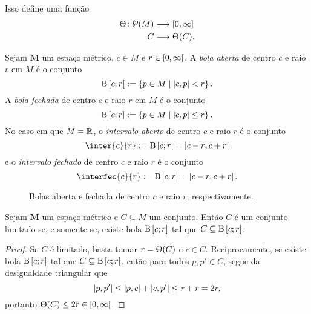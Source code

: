 Isso define uma função
	\begin{align*}
	\func{\diam}{\p(M)}{\intff{0}{\infty}}{C}{\diam(C)}.
	\end{align*}

\begin{definition}
Sejam $\bm M$ um espaço métrico, $c \in M$ e $r \in \left[{0},{\infty}\right[$. A \emph{bola aberta} de centro $c$ e raio $r$ em $M$ é o conjunto
	\begin{equation*}
	\mathrm{B}\left[{c};{r}\right[ := \left\{{p \in M}\;\middle\vert\;{\left\vert{c},{p}\right\vert < r}\right\}.
	\end{equation*}
A \emph{bola fechada} de centro $c$ e raio $r$ em $M$ é o conjunto
	\begin{equation*}
	\mathrm{B}\left[{c};{r}\right] := \left\{{p \in M}\;\middle\vert\;{\left\vert{c},{p}\right\vert \leq r}\right\}.
	\end{equation*}
No caso em que $M = \mathbb{R}$, o \emph{intervalo aberto} de centro $c$ e raio $r$ é o conjunto
	\begin{equation*}
	\inter{c}{r} := \bola{c}{r} = \intaa{c-r}{c+r}
	\end{equation*}
e o \emph{intervalo fechado} de centro $c$ e raio $r$ é o conjunto
	\begin{equation*}
	\interfec{c}{r} := \bolafec{c}{r} = \intff{c-r}{c+r}.
	\end{equation*}
\end{definition}

\begin{figure}
\centering
{}\hspace{3cm}
\caption{Bolas aberta e fechada de centro $c$ e raio $r$, respectivamente.}
\end{figure}

\begin{proposition}
\label{prop:criterio.limitacao.bola}
Sejam $\bm M$ um espaço métrico e $C \subseteq M$ um conjunto. Então $C$ é um conjunto limitado se, e somente se, existe bola $\mathrm{B}\left[{c};{r}\right]$ tal que $C \subseteq \mathrm{B}\left[{c};{r}\right]$.
\end{proposition}
\begin{proof}
Se $C$ é limitado, basta tomar $r=\Theta(C)$ e $c \in C$. Reciprocamente, se existe bola $\mathrm{B}\left[{c};{r}\right]$ tal que $C \subseteq \mathrm{B}\left[{c};{r}\right]$, então para todos $p,p' \in C$, segue da desigualdade triangular que
	\begin{equation*}
	\left\vert{p},{p'}\right\vert \leq \left\vert{p},{c}\right\vert+\left\vert{c},{p'}\right\vert \leq r+r=2r,
	\end{equation*}
portanto $\Theta(C) \leq 2r \in \left[{0},{\infty}\right[$.
\end{proof}

